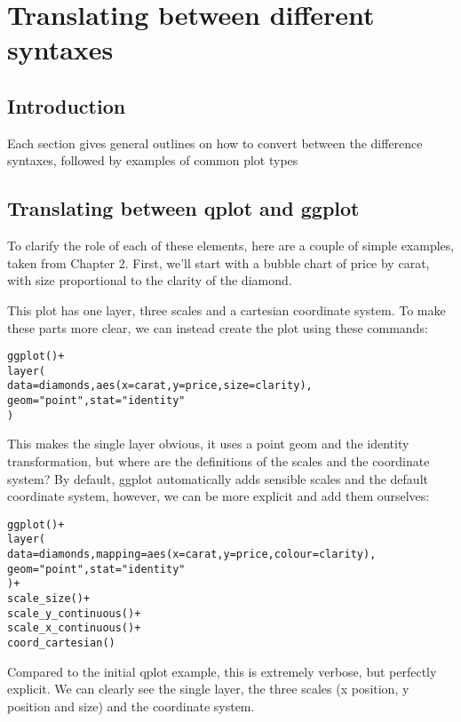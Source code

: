
\chapter{Translating between different syntaxes}
\label{cha:translating}

\section{Introduction}
\label{sec:introduction}

Each section gives general outlines on how to convert between the difference syntaxes, followed by examples of common plot types


\section{Translating between qplot and ggplot}
\label{sec:qplot-ggplot}


To clarify the role of each of these elements, here are a couple of simple examples, taken from Chapter 2.  First, we'll start with a bubble chart of price by carat, with size proportional to the clarity of the diamond.


This plot has one layer, three scales and a cartesian coordinate system.  To make these parts more clear, we can instead create the plot using these commands:

\begin{alltt}
ggplot() + 
layer(
  data = diamonds, aes(x = carat, y = price, size = clarity),
  geom = "point", stat = "identity"
)
\end{alltt}

This makes the single layer obvious, it uses a point geom and the identity transformation, but where are the definitions of the scales and the coordinate system?  By default, ggplot automatically adds sensible scales and the default coordinate system, however, we can be more explicit and add them ourselves:

\begin{alltt}
ggplot() + 
layer(
  data = diamonds, mapping = aes(x = carat, y = price, colour = clarity),
  geom = "point", stat = "identity"
) + 
scale_size() + 
scale_y_continuous() + 
scale_x_continuous() + 
coord_cartesian()
\end{alltt}

Compared to the initial qplot example, this is extremely verbose, but perfectly explicit.  We  can clearly see the single layer, the three scales (x position, y position and size) and the coordinate system.  

